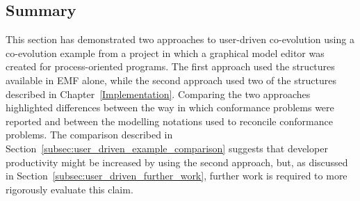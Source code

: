 \subsection{Summary}
\label{subsec:user_driven_example_summary}
This section has demonstrated two approaches to user-driven co-evolution using a co-evolution example from a project in which a graphical model editor was created for process-oriented programs. The first approach used the structures available in EMF alone, while the second approach used two of the structures described in Chapter~\ref{Implementation}. Comparing the two approaches highlighted differences between the way in which conformance problems were reported and between the modelling notations used to reconcile conformance problems. The comparison described in Section~\ref{subsec:user_driven_example_comparison} suggests that developer productivity might be increased by using the second approach, but, as discussed in Section~\ref{subsec:user_driven_further_work}, further work is required to more rigorously evaluate this claim.

